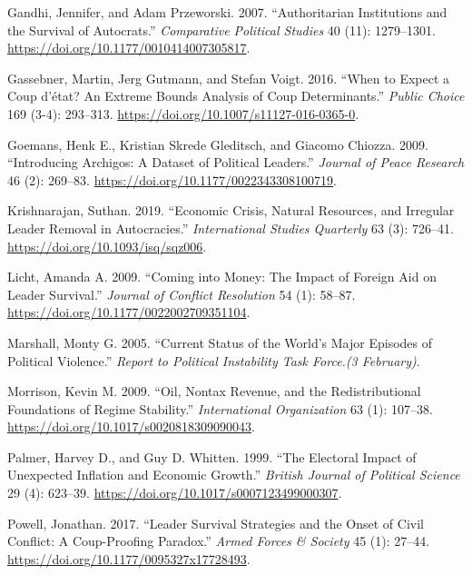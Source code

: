 \documentclass[
  12pt,
]{article}
\newlength{\cslhangindent}
\newenvironment{CSLReferences}[2] %
 {\begin{list}{}{%
  \setlength{\itemindent}{0pt}
  \setlength{\leftmargin}{0pt}
  \setlength{\parsep}{0pt}
  \ifodd #1
   \setlength{\leftmargin}{\cslhangindent}
   \setlength{\itemindent}{-1\cslhangindent}
  \fi
  \setlength{\itemsep}{#2\baselineskip}}}
 {\end{list}}
\begin{document}
\begin{CSLReferences}{1}{0}
Gandhi, Jennifer, and Adam Przeworski. 2007. {``Authoritarian
Institutions and the Survival of Autocrats.''} \emph{Comparative
Political Studies} 40 (11): 1279--1301.
\url{https://doi.org/10.1177/0010414007305817}.

Gassebner, Martin, Jerg Gutmann, and Stefan Voigt. 2016. {``When to
Expect a Coup d{'}état? An Extreme Bounds Analysis of Coup
Determinants.''} \emph{Public Choice} 169 (3-4): 293--313.
\url{https://doi.org/10.1007/s11127-016-0365-0}.

Goemans, Henk E., Kristian Skrede Gleditsch, and Giacomo Chiozza. 2009.
{``Introducing Archigos: A Dataset of Political Leaders.''}
\emph{Journal of Peace Research} 46 (2): 269--83.
\url{https://doi.org/10.1177/0022343308100719}.

Krishnarajan, Suthan. 2019. {``Economic Crisis, Natural Resources, and
Irregular Leader Removal in Autocracies.''} \emph{International Studies
Quarterly} 63 (3): 726--41. \url{https://doi.org/10.1093/isq/sqz006}.

Licht, Amanda A. 2009. {``Coming into Money: The Impact of Foreign Aid
on Leader Survival.''} \emph{Journal of Conflict Resolution} 54 (1):
58--87. \url{https://doi.org/10.1177/0022002709351104}.

Marshall, Monty G. 2005. {``Current Status of the World's Major Episodes
of Political Violence.''} \emph{Report to Political Instability Task
Force.(3 February)}.

Morrison, Kevin M. 2009. {``Oil, Nontax Revenue, and the
Redistributional Foundations of Regime Stability.''} \emph{International
Organization} 63 (1): 107--38.
\url{https://doi.org/10.1017/s0020818309090043}.

Palmer, Harvey D., and Guy D. Whitten. 1999. {``The Electoral Impact of
Unexpected Inflation and Economic Growth.''} \emph{British Journal of
Political Science} 29 (4): 623--39.
\url{https://doi.org/10.1017/s0007123499000307}.

Powell, Jonathan. 2017. {``Leader Survival Strategies and the Onset of
Civil Conflict: A Coup-Proofing Paradox.''} \emph{Armed Forces \&
Society} 45 (1): 27--44. \url{https://doi.org/10.1177/0095327x17728493}.


\end{CSLReferences}
\end{document}
